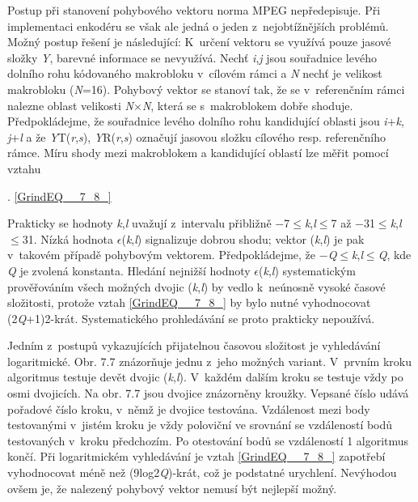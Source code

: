 \noindent 

\noindent Postup při stanovení pohybového vektoru norma MPEG nepředepisuje. Při implementaci enkodéru se však ale jedná o jeden z~nejobtížnějších problémů. Možný postup řešení je následující: K~určení vektoru se využívá pouze jasové složky \textit{Y}, barevné informace se nevyužívá. Nechť \textit{i},\textit{j} jsou souřadnice levého dolního rohu kódovaného makrobloku v~cílovém rámci a \textit{N} nechť je velikost makrobloku (\textit{N}=16). Pohybový vektor se stanoví tak, že se v~referenčním rámci nalezne oblast velikosti \textit{N}$\times$\textit{N}, která se s~makroblokem dobře shoduje. Předpokládejme, že souřadnice levého dolního rohu kandidující oblasti jsou \textit{i}+\textit{k}, \textit{j}+\textit{l} a že \textit{Y}T(\textit{r},\textit{s}), \textit{Y}R(\textit{r},\textit{s}) označují jasovou složku cílového resp. referenčního rámce. Míru shody mezi makroblokem a kandidující oblastí lze měřit pomocí vztahu

 . \eqref{GrindEQ__7_8_}

\noindent Prakticky se hodnoty \textit{k},\textit{l} uvažují z~intervalu přibližně $-$7$\leq$\textit{k},\textit{l}$\leq$7 až $-$31$\leq$\textit{k},\textit{l}$\leq$31. Nízká hodnota $\epsilon$(\textit{k},\textit{l}) signalizuje dobrou shodu; vektor (\textit{k},\textit{l}) je pak v~takovém případě pohybovým vektorem. Předpokládejme, že $-$\textit{Q}$\leq$\textit{k},\textit{l}$\leq$\textit{Q}, kde \textit{Q} je zvolená konstanta. Hledání nejnižší hodnoty $\epsilon$(\textit{k},\textit{l}) systematickým prověřováním všech možných dvojic (\textit{k},\textit{l}) by vedlo k~neúnosně vysoké časové složitosti, protože vztah \eqref{GrindEQ__7_8_} by bylo nutné vyhodnocovat (2\textit{Q}+1)2-krát. Systematického prohledávání se proto prakticky nepoužívá. 

\noindent 

\noindent 

\noindent Jedním z~postupů vykazujících přijatelnou časovou složitost je vyhledávání logaritmické. Obr. 7.7  znázorňuje jednu z~jeho možných variant. V~prvním kroku algoritmus testuje devět dvojic (\textit{k},\textit{l}). V~každém dalším kroku se testuje vždy po osmi dvojicích. Na obr. 7.7 jsou dvojice znázorněny kroužky. Vepsané číslo udává pořadové číslo kroku, v~němž je dvojice testována. Vzdálenost mezi body testovanými v~jistém kroku je vždy poloviční ve srovnání se vzdáleností bodů testovaných v~kroku předchozím. Po otestování bodů se vzdáleností 1 algoritmus končí. Při logaritmickém vyhledávání je vztah \eqref{GrindEQ__7_8_} zapotřebí vyhodnocovat méně než (9log2\textit{Q})-krát, což je podstatné urychlení. Nevýhodou ovšem je, že nalezený pohybový vektor nemusí být nejlepší možný.


